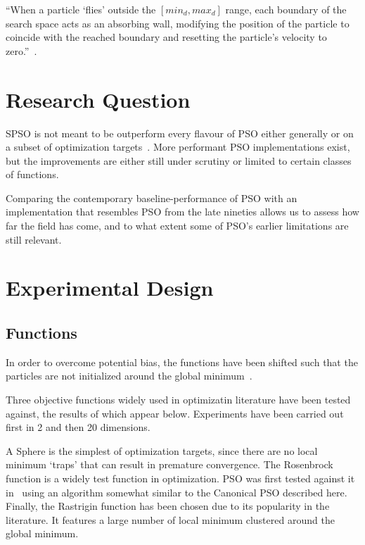 \documentclass{csfourzero}
\begin{document}
``When a particle `flies' outside the $[min_d ,max_d]$ range, each boundary of
the search space acts as an absorbing wall, modifying the position of the
particle to coincide with the reached boundary and resetting the particle's
velocity to zero.''~\cite{ZambranoBigiarini:2013dl}.

\section{Research Question}

SPSO is not meant to be outperform every flavour of PSO either generally or on a
subset of optimization targets~\cite{Bratton:2007hq}. More performant PSO
implementations exist, but the improvements are either still under scrutiny or
limited to certain classes of functions.

Comparing the contemporary baseline-performance of PSO with an implementation
that resembles PSO from the late nineties allows us to assess how far the field
has come, and to what extent some of PSO's earlier limitations are still
relevant.



\section{Experimental Design}


\subsection{Functions}

In order to overcome potential bias, the functions have been shifted such that
the particles are not initialized around the global
minimum~\cite{Monson:2005fn}.

Three objective functions widely used in optimizatin literature have been tested
against, the results of which appear below. Experiments have been carried out
first in 2 and then 20 dimensions.

A Sphere is the simplest of optimization targets, since there are no local
minimum `traps' that can result in premature convergence. The Rosenbrock
function is a widely test function in optimization. PSO was first tested against
it in~\cite{Shi:1999je} using an algorithm somewhat similar to the Canonical PSO
described here.  Finally, the Rastrigin function has been chosen due to its
popularity in the literature. It features a large number of local minimum
clustered around the global minimum.
\end{document}
